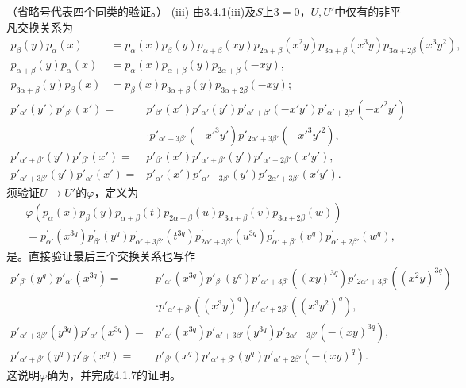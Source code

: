 （省略号代表四个同类的验证。）
(iii) 由3.4.1(iii)及$S$上$3=0$，$U,U'$中仅有的非平凡交换关系为
\[\begin{aligned}p_\beta(y)p_\alpha(x)&=p_\alpha(x)p_\beta(y)p_{\alpha+\beta}(xy)p_{2\alpha+\beta}(x^2y)p_{3\alpha+\beta}(x^3y)p_{3\alpha+2\beta}(x^3y^2),\\p_{\alpha+\beta}(y)p_\alpha(x)&=p_\alpha(x)p_{\alpha+\beta}(y)p_{2\alpha+\beta}(-xy),\\p_{3\alpha+\beta}(y)p_\beta(x)&=p_\beta(x)p_{3\alpha+\beta}(y)p_{3\alpha+2\beta}(-xy);\end{aligned}\]
\[\begin{aligned}p'_{\alpha'}(y')p'_{\beta'}(x')={}&p'_{\beta'}(x')p'_{\alpha'}(y')p'_{\alpha'+\beta'}(-x'y')p'_{\alpha'+2\beta'}(-x'^2y')\\&\cdot p'_{\alpha'+3\beta'}(-x'^3y')p'_{2\alpha'+3\beta'}(-x'^3y'^2),\\p'_{\alpha'+\beta'}(y')p'_{\beta'}(x')={}&p'_{\beta'}(x')p'_{\alpha'+\beta'}(y')p'_{\alpha'+2\beta'}(x'y'),\\p'_{\alpha'+3\beta'}(y')p'_{\alpha'}(x')={}&p'_{\alpha'}(x')p'_{\alpha'+3\beta'}(y')p'_{2\alpha'+3\beta'}(x'y').\end{aligned}\]
须验证$U\to U'$的$\varphi$，定义为
\[\begin{aligned}{}&\varphi(p_\alpha(x)p_\beta(y)p_{\alpha+\beta}(t)p_{2\alpha+\beta}(u)p_{3\alpha+\beta}(v)p_{3\alpha+2\beta}(w))\\{}&=p^{\prime}_{\alpha'}(x^{3q})p^{\prime}_{\beta'}(y^q)p^{\prime}_{\alpha'+3\beta'}(t^{3q})p^{\prime}_{2\alpha'+3\beta'}(u^{3q})p^{\prime}_{\alpha'+\beta'}(v^q)p^{\prime}_{\alpha'+2\beta'}(w^q),\end{aligned}\]
是。直接验证最后三个交换关系也写作
\[\begin{aligned}p'_{\beta'}(y^q)p'_{\alpha'}(x^{3q})={}&p'_{\alpha'}(x^{3q})p'_{\beta'}(y^q)p'_{\alpha'+3\beta'}((xy)^{3q})p'_{2\alpha'+3\beta'}((x^2y)^{3q})\\&\cdot p'_{\alpha'+\beta'}((x^3y)^q)p'_{\alpha'+2\beta'}((x^3y^2)^q),\\p'_{\alpha'+3\beta'}(y^{3q})p'_{\alpha'}(x^{3q})={}&p'_{\alpha'}(x^{3q})p'_{\alpha'+3\beta'}(y^{3q})p'_{2\alpha'+3\beta'}(-(xy)^{3q}),\\p'_{\alpha'+\beta'}(y^q)p'_{\beta'}(x^q)={}&p'_{\beta'}(x^q)p'_{\alpha'+\beta'}(y^q)p'_{\alpha'+2\beta'}(-(xy)^q).\end{aligned}\]
这说明$\varphi$确为，并完成4.1.7的证明。
